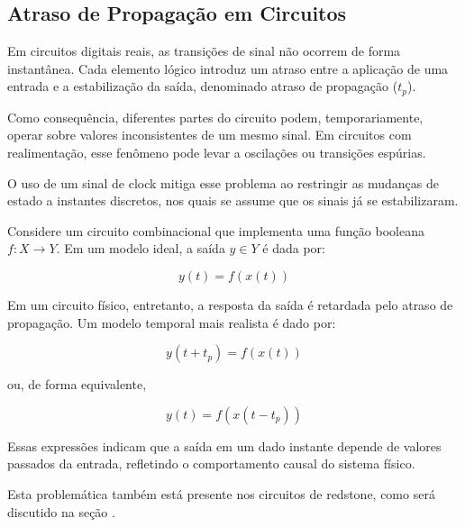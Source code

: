 \subsection{Atraso de Propagação em Circuitos}

Em circuitos digitais reais, as transições de sinal não ocorrem de forma instantânea. Cada elemento lógico introduz um atraso entre a aplicação de uma entrada e a estabilização da saída, denominado atraso de propagação ($t_p$).

Como consequência, diferentes partes do circuito podem, temporariamente, operar sobre valores inconsistentes de um mesmo sinal. Em circuitos com realimentação, esse fenômeno pode levar a oscilações ou transições espúrias.

O uso de um sinal de clock mitiga esse problema ao restringir as mudanças de estado a instantes discretos, nos quais se assume que os sinais já se estabilizaram.

Considere um circuito combinacional que implementa uma função booleana $f : X \rightarrow Y$. Em um modelo ideal, a saída $y \in Y$ é dada por:

\[
y(t) = f(x(t))
\]

Em um circuito físico, entretanto, a resposta da saída é retardada pelo atraso de propagação. Um modelo temporal mais realista é dado por:

\[
y(t + t_p) = f(x(t))
\]

ou, de forma equivalente,

\[
y(t) = f(x(t - t_p))
\]

Essas expressões indicam que a saída em um dado instante depende de valores passados da entrada, refletindo o comportamento causal do sistema físico.

Esta problemática também está presente nos circuitos de redstone, como será discutido na seção .